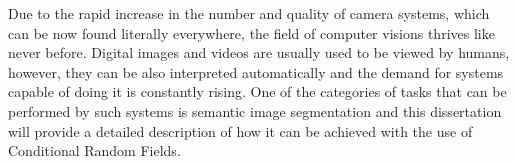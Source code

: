 Due to the rapid increase in the number and quality of camera systems, which can be now found literally everywhere, the field of computer visions thrives like never before. Digital images and videos are usually used to be viewed by humans, however, they can be also interpreted automatically and the demand for systems capable of doing it is constantly rising. One of the categories of tasks that can be performed by such systems is semantic image segmentation and this dissertation will provide a detailed description of how it can be achieved with the use of Conditional Random Fields.